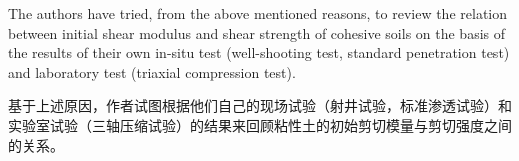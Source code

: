 \begin{paracol}{2}
    \switchcolumn*
    
    The authors have tried, from the above mentioned reasons, to review the relation between initial shear modulus and shear strength of cohesive soils on the basis of the results of their own in-situ test (well-shooting test, standard penetration test) and laboratory test (triaxial compression test).

    \switchcolumn

    基于上述原因，作者试图根据他们自己的现场试验（射井试验，标准渗透试验）和实验室试验（三轴压缩试验）的结果来回顾粘性土的初始剪切模量与剪切强度之间的关系。


\end{paracol}